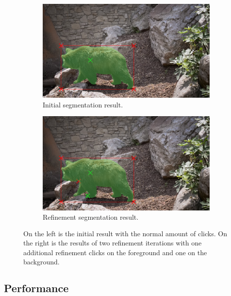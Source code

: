 \begin{figure} 
	\centering
	\begin{subfigure}[b]{0.45\textwidth}
		\centering
		\includegraphics[width=\textwidth]{figures/chap34_bear_6.png}
		\caption{Initial segmentation result.}
		\label{fig:ch3:sec4:refinement_1}
	\end{subfigure}
	\hfill
	\begin{subfigure}[b]{0.45\textwidth}
		\centering
		\includegraphics[width=\textwidth]{figures/chap34_bear_8.png}
		\caption{Refinement segmentation result.}
		\label{fig:ch3:sec4:refinement_2}
	\end{subfigure}
	\caption[IOG Refinement]{
		On the left is the initial result with the normal amount of clicks. 
		On the right is the results of two refinement iterations with one additional refinement clicks on the foreground and one on the background.
	} \label{fig:ch3:sec4:refinement}
\end{figure}


\subsection{Performance}\label{ord:ch3:sec4:subsec5}

